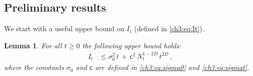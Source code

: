 \documentclass[a4paper,reqno,11pt]{amsart}
\numberwithin{equation}{section}
\newtheorem{lemma}[theorem]{Lemma}
\newcommand\sfc{\mathsf{c}}
\newcommand\sfd{\mathsf{d}}
\newcommand\blue{\color{blue}}
\begin{document}
\subsection{Preliminary results}
\label{ch3:prelsec}

We start with a useful upper bound on $I_t$
(defined in \eqref{ch3:eq:It}).

\begin{lemma} \label{ch3:th:usefulub}
For all $t \ge 0$ the following upper bound holds:
\begin{equation}\label{ch3:eq:eqItupfin}
\begin{split}
	 I_t & \le \sigma_0^2 \, t \,+\, \sfc^2 \, N_t^{1-2D}\, t^{2D} \,,
\end{split}
\end{equation}
where the constants $\sigma_0$ and $\sfc$ are defined in
\eqref{ch3:eq:sigma0} and \eqref{ch3:eq:sigmat}.
\end{lemma}
\end{document}
